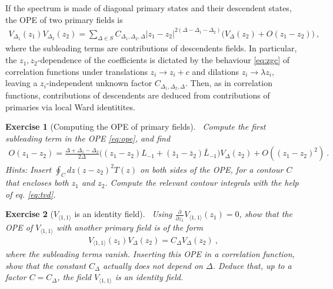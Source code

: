 \documentclass[12pt, a4paper]{article}
\theoremstyle{break}
\newtheorem{exo}{Exercise}[section]
\begin{document}
If
the spectrum is made of diagonal primary states and their descendent states, the OPE of two primary fields is
\begin{align}
 V_{\Delta_1}(z_1) V_{\Delta_2}(z_2) 
 = \sum_{\Delta\in S} C_{\Delta_1,\Delta_2,\Delta} |z_1-z_2|^{2(\Delta-\Delta_1-\Delta_2)}
 \Big(V_{\Delta}(z_2) + O(z_1-z_2) \Big)\ ,
 \label{eq:ope}
\end{align}
where the subleading terms are contributions of descendents fields. 
In particular, the $z_1,z_2$-dependence of the coefficients is dictated by the behaviour \eqref{eq:zgc}
of correlation functions under translations $z_i\to z_i+c$ and dilations $z_i\to\lambda z_i$, leaving a $z_i$-independent unknown factor $C_{\Delta_1,\Delta_2,\Delta}$.
Then, as in correlation functions, contributions of descendents are deduced from contributions of primaries via local Ward identitites.

\begin{exo}[Computing the OPE of primary fields]
~\label{exo:ope}
 Compute the first subleading term in the OPE \eqref{eq:ope}, and find
 \begin{align}
  O(z_1-z_2) = \frac{\Delta+\Delta_1-\Delta_2}{2\Delta} \Big( (z_1-z_2)L_{-1}+(\bar z_1-\bar z_2)\bar L_{-1}\Big) V_{\Delta}(z_2) + O((z_1-z_2)^2)\ .
 \end{align}
Hints: Insert $\oint_C dz(z-z_2)^2 T(z)$ on both sides of the OPE, for a contour $C$ that encloses both $z_1$ and $z_2$. Compute the relevant contour integrals with the help of eq. \eqref{eq:tvd}.
\end{exo}

\begin{exo}[$V_{\langle 1,1\rangle}$ is an identity field]
~\label{exo:id}
Using $\frac{\partial}{\partial z_1} V_{\langle 1,1\rangle}(z_1)=0$, show that the OPE of $V_{\langle 1,1\rangle}$ with another primary field is of the form 
\begin{align}
 V_{\langle 1,1\rangle}(z_1)V_\Delta(z_2) = C_\Delta V_\Delta(z_2)\ ,
\end{align}
where the subleading terms vanish. Inserting this OPE in a correlation function, show that the constant $C_\Delta$ actually does not depend on $\Delta$. Deduce that, up to a factor $C=C_\Delta$, the field $V_{\langle 1,1\rangle}$ is an identity field.
\end{exo}
\end{document}
